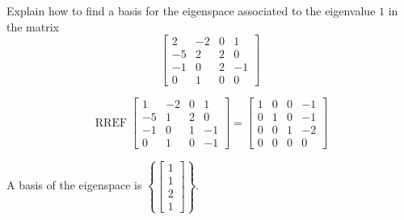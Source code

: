 
\begin{exerciseStatement}


Explain how to find a basis for the eigenspace associated to the eigenvalue \( 1 \) in the matrix \[ \left[\begin{array}{cccc}
2 & -2 & 0 & 1 \\
-5 & 2 & 2 & 0 \\
-1 & 0 & 2 & -1 \\
0 & 1 & 0 & 0
\end{array}\right] \]


\end{exerciseStatement}
    
\begin{exerciseAnswer} 


\[\operatorname{RREF} \left[\begin{array}{cccc}
1 & -2 & 0 & 1 \\
-5 & 1 & 2 & 0 \\
-1 & 0 & 1 & -1 \\
0 & 1 & 0 & -1
\end{array}\right] = \left[\begin{array}{cccc}
1 & 0 & 0 & -1 \\
0 & 1 & 0 & -1 \\
0 & 0 & 1 & -2 \\
0 & 0 & 0 & 0
\end{array}\right] \]



A basis of the eigenspace is \( \left\{ \left[\begin{array}{c}
1 \\
1 \\
2 \\
1
\end{array}\right] \right\} \).


\end{exerciseAnswer}
    
